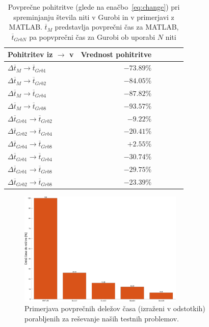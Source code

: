 \documentclass[a4paper,11pt]{article}
\begin{document}
\begin{table} \centering
\begin{tabular}{| l | r | r | r | r | r |}
\hline
Pohitritev iz $\rightarrow$ v & Vrednost pohitritve \\
\hline
$\Delta \overline{t}_M \rightarrow \overline{t}_{Grb1}$  & $-73.89\%$ \\
$\Delta \overline{t}_M \rightarrow \overline{t}_{Grb2}$  & $-84.05\%$ \\
$\Delta \overline{t}_M \rightarrow \overline{t}_{Grb4}$  & $-87.82\%$ \\
$\Delta \overline{t}_M \rightarrow \overline{t}_{Grb8}$  & $-93.57\%$ \\

$\Delta \overline{t}_{Grb1} \rightarrow \overline{t}_{Grb2}$  & $-9.22\%$ \\
$\Delta \overline{t}_{Grb2} \rightarrow \overline{t}_{Grb4}$  & $-20.41\%$ \\
$\Delta \overline{t}_{Grb4} \rightarrow \overline{t}_{Grb8}$  & $+2.55\%$ \\
$\Delta \overline{t}_{Grb1} \rightarrow \overline{t}_{Grb4}$  & $-30.74\%$ \\
$\Delta \overline{t}_{Grb1} \rightarrow \overline{t}_{Grb8}$  & $-29.75\%$ \\
$\Delta \overline{t}_{Grb2} \rightarrow \overline{t}_{Grb8}$  & $-23.39\%$ \\
	
\hline
\end{tabular}
\caption{Povprečne pohitritve (glede na enačbo~\ref{eq:change}) pri spreminjanju števila niti v Gurobi in v primerjavi z MATLAB. $\overline{t}_{M}$ predstavlja povprečni čas za MATLAB, $\overline{t}_{GrbN}$ pa popvprečni čas za Gurobi ob uporabi $N$ niti}
\label{tab:bench_changes}
\end{table}

\begin{figure}[htpb]
	\centering
	\includegraphics[width=0.7\textwidth]{images/gurobi_matlab_speedup.png}
	\caption{Primerjava povprečnih deležov časa (izraženi v odstotkih) porabljenih za reševanje naših testnih problemov.}
	\label{img:gurobi_vs_matlab}
\end{figure}
\end{document}
